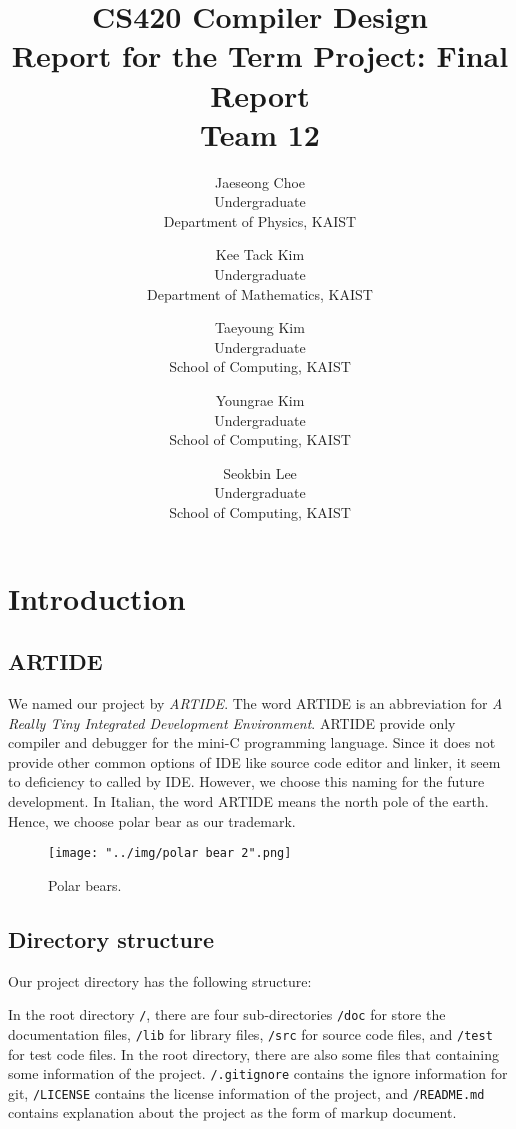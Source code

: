 \documentclass{article}
\title
{
	CS420 Compiler Design\\
	Report for the Term Project: Final Report\\
	${}$\\
	Team 12
}
\author
{
	Jaeseong Choe\\
	Undergraduate\\
	Department of Physics, KAIST
	\and
	Kee Tack Kim\\
	Undergraduate\\
	Department of Mathematics, KAIST
	\and
	Taeyoung Kim\\
	Undergraduate\\
	School of Computing, KAIST
	\and
	Youngrae Kim\\
	Undergraduate\\
	School of Computing, KAIST
	\and
	Seokbin Lee\\
	Undergraduate\\
	School of Computing, KAIST
}
\newcommand{\code}[1]{\texttt{#1}}
\begin{document}
	\maketitle
	
	\section{Introduction}
	
	\subsection{ARTIDE}
	
	We named our project by \emph{ARTIDE}. The word ARTIDE is an abbreviation for \emph{A Really Tiny Integrated Development Environment}. ARTIDE provide only compiler and debugger for the mini-C programming language. Since it does not provide other common options of IDE like source code editor and linker, it seem to deficiency to called by IDE. However, we choose this naming for the future development. In Italian, the word ARTIDE means the north pole of the earth. Hence, we choose polar bear as our trademark.
	
	\begin{figure}
		\centering
		\texttt{[image: "../img/polar bear 2".png]}
		\caption{Polar bears.}
	\end{figure}
	
	\subsection{Directory structure}
	
	Our project directory has the following structure:
	
	In the root directory \code{/}, there are four sub-directories \code{/doc} for store the documentation files, \code{/lib} for library files, \code{/src} for source code files, and \code{/test} for test code files. In the root directory, there are also some files that containing some information of the project. \code{/.gitignore} contains the ignore information for git, \code{/LICENSE} contains the license information of the project, and \code{/README.md} contains explanation about the project as the form of markup document.
	
\end{document}

